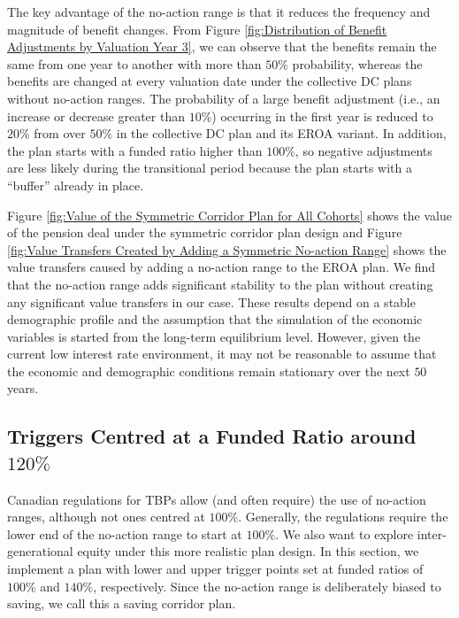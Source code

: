 \documentclass{sfuthesis}
\numberwithin{equation}{chapter}
\begin{document}
		\justify
		The key advantage of the no-action range is that it reduces the frequency and magnitude of benefit changes. From Figure \ref{fig:Distribution of Benefit Adjustments by Valuation Year 3}, we can observe that the benefits remain the same from one year to another with more than $50\%$ probability, whereas the benefits are changed at every valuation date under the collective DC plans without no-action ranges. The probability of a large benefit adjustment (i.e., an increase or decrease greater than $10\%$) occurring in the first year is reduced to $20\%$ from over $50\%$ in the collective DC plan and its EROA variant. In addition, the plan starts with a funded ratio higher than $100\%$, so negative adjustments are less likely during the transitional period because the plan starts with a ``buffer'' already in place.		
	
	
		\justify
		Figure \ref{fig:Value of the Symmetric Corridor Plan for All Cohorts} shows the value of the pension deal under the symmetric corridor plan design and Figure \ref{fig:Value Transfers Created by Adding a Symmetric No-action Range} shows the value transfers caused by adding a no-action range to the EROA plan. We find that the no-action range adds significant stability to the plan without creating any significant value transfers in our case. These results depend on a stable demographic profile and the assumption that the simulation of the economic variables is started from the long-term equilibrium level. However, given the current low interest rate environment, it may not be reasonable to assume that the economic and demographic conditions remain stationary over the next $50$ years.
    
    
	\subsection{Triggers Centred at a Funded Ratio around $120\%$}
	\label{Triggers Centred at a Funded Ratio around 120}

	
	
		\justify
	    Canadian regulations for TBPs allow (and often require) the use of no-action ranges, although not ones centred at $100\%$. Generally, the regulations require the lower end of the no-action range to start at $100\%$. We also want to explore inter-generational equity under this more realistic plan design. In this section, we implement a plan with lower and upper trigger points set at funded ratios of $100\%$ and $140\%$, respectively. Since the no-action range is deliberately biased to saving, we call this a saving corridor plan. 
		
\end{document}
